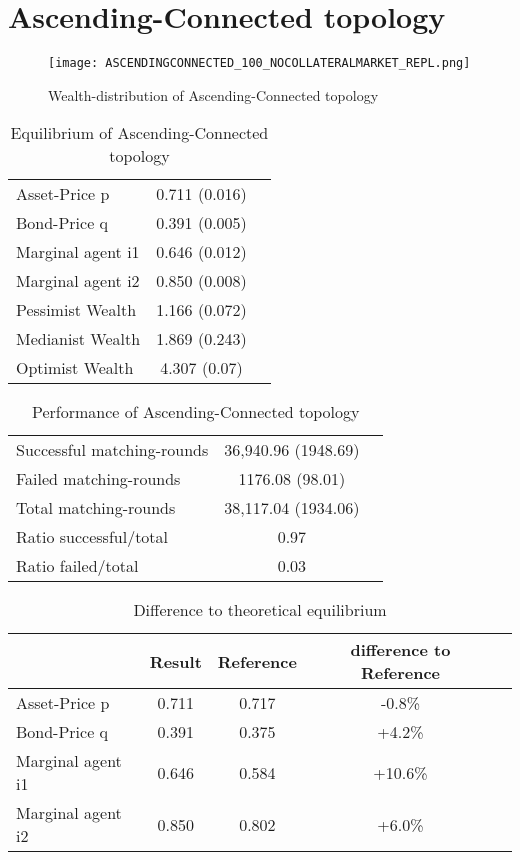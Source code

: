 \documentclass[Bachelorarbeit.tex]{subfiles}
\begin{document}
\section{Ascending-Connected topology} 

\begin{figure}[H]
	\centering
  \texttt{[image: ASCENDINGCONNECTED\_100\_NOCOLLATERALMARKET\_REPL.png]}
	\caption{Wealth-distribution of Ascending-Connected topology}
	\label{fig:wealth_ASCENDINGCONNECTED_100_NOCOLLATERALMARKET_REPL}
\end{figure}

\begin{table}[H]
	\caption{Equilibrium of Ascending-Connected topology}
	\centering
	\begin{tabular} { l c r }
		\hline
		Asset-Price p & 0.711 (0.016) \\
		Bond-Price q & 0.391 (0.005) \\
		Marginal agent i1 & 0.646 (0.012) \\
		Marginal agent i2 & 0.850 (0.008) \\
		\hline
		Pessimist Wealth & 1.166 (0.072) \\
		Medianist Wealth & 1.869 (0.243) \\
		Optimist Wealth & 4.307 (0.07) \\
		\hline
	\end{tabular}
	\label{tab:ascendingconnected_equilibrium_100Agents_05Bond}
\end{table} 

\begin{table}[H]
	\caption{Performance of Ascending-Connected topology}
	\centering
	\begin{tabular} { l c r }
		\hline
		Successful matching-rounds & 36,940.96 (1948.69) \\
		Failed matching-rounds & 1176.08 (98.01) \\
		Total matching-rounds & 38,117.04 (1934.06) \\
		\hline
		Ratio successful/total & 0.97 \\
		Ratio failed/total & 0.03 \\
		\hline
	\end{tabular}
\end{table}

\begin{table}[H]
	\caption{Difference to theoretical equilibrium}
	\centering
	\begin{tabular} { l c c c r }
		& Result & Reference & difference to Reference \\
		\hline
		Asset-Price p & 0.711 & 0.717 & -0.8\% \\
		Bond-Price q & 0.391 & 0.375 & +4.2\% \\
		Marginal agent i1 & 0.646  & 0.584 & +10.6\% \\
		Marginal agent i2 & 0.850 & 0.802 & +6.0\% \\
		\hline
	\end{tabular}
\end{table}
\end{document}
